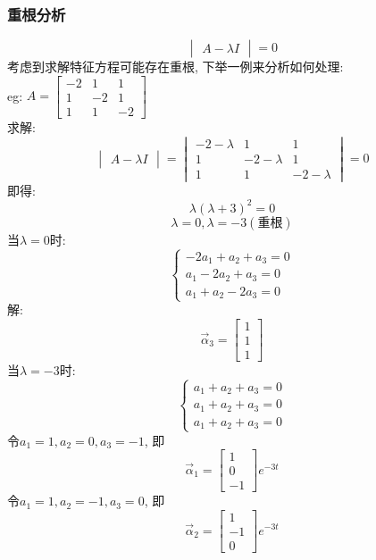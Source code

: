 \subsubsection{\large 重根分析}
\[
\begin{vmatrix}
    A - \lambda I
\end{vmatrix}
= 0
\]
考虑到求解特征方程可能存在重根, 下举一例来分析如何处理:\\
eg: 
$A =
\begin{bmatrix}
    -2 & 1 & 1 \\
      1 & -2 & 1 \\
      1 & 1 & -2
\end{bmatrix}$\\
求解:
\[
\begin{vmatrix}
    A - \lambda I
\end{vmatrix}
=
\begin{vmatrix}
    -2-\lambda & 1 & 1 \\
      1 & -2-\lambda & 1 \\
      1 & 1 & -2-\lambda
\end{vmatrix}=0
\]
即得:
\[ \lambda (\lambda + 3)^2 = 0 \]
\[ \lambda = 0, \lambda = -3 (\text{重根})\]
当$\lambda = 0$时:
\[
\begin{cases}
    -2a_1 + a_2 + a_3 = 0 \\
    a_1 - 2a_2 + a_3 = 0 \\
    a_1 + a_2 - 2a_3 = 0
\end{cases}
\]
解:
\[
\vec{\alpha}_3  
=
\begin{bmatrix}
    1 \\
    1 \\
    1
\end{bmatrix}
\]
当$\lambda = -3$时:
\[
\begin{cases}
    a_1 + a_2 + a_3 = 0 \\
    a_1 + a_2 + a_3 = 0 \\
    a_1 + a_2 + a_3 = 0
\end{cases}
\]
令$a_1 = 1, a_2 = 0, a_3 = -1$, 即
\[
\vec{\alpha}_1 =
\begin{bmatrix}
    1 \\
    0 \\
    -1
\end{bmatrix}
e^{-3t}
\]
令$a_1 = 1, a_2 = -1, a_3 = 0$, 即
\[
\vec{\alpha}_2 =
\begin{bmatrix}
    1 \\
    -1 \\
    0
\end{bmatrix}
e^{-3t}
\]

